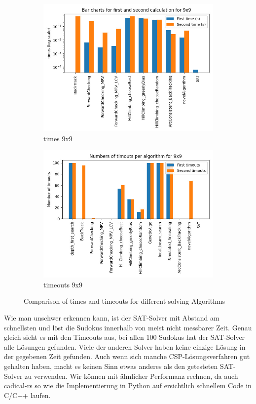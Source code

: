     \begin{figure}[t]
        \centering
        
        \begin{subfigure}[b]{0.8\textwidth}
            \includegraphics[width=\textwidth]{Pictures/times_9x9}
            \caption{times 9x9}
        \end{subfigure}
        \hfill
        \begin{subfigure}[b]{0.8\textwidth}
            \includegraphics[width=\linewidth]{Pictures/timeouts_9x9}
            \caption{timeouts 9x9}
        \end{subfigure}
        
        \caption{Comparison of times and timeouts for different solving Algorithms}
    \end{figure}

Wie man unschwer erkennen kann, ist der SAT-Solver mit Abstand am schnellsten und löst die Sudokus innerhalb von meist nicht messbarer Zeit. 
Genau gleich sieht es mit den Timeouts aus, bei allen 100 Sudokus hat der SAT-Solver alle Lösungen gefunden. Viele der anderen Solver haben keine einzige Lösung in der gegebenen Zeit gefunden.
Auch wenn sich manche CSP-Lösungsverfahren gut gehalten haben, macht es keinen Sinn etwas anderes als den getesteten SAT-Solver zu verwenden.
Wir können mit ähnlicher Performanz rechnen, da auch cadical-rs so wie die Implementierung in Python auf ersichtlich schnellem Code in C/C++ laufen.
